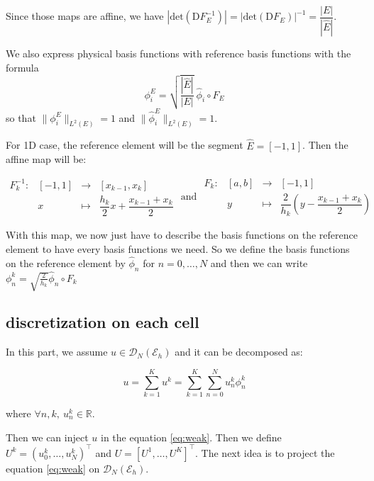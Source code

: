 \documentclass[a4paper,10pt,draft]{article}
\begin{document}
Since those maps are affine, we have $|\mathrm{det}(\mathrm{D}F_E^{-1})| = 
|\mathrm{det}(\mathrm{D}F_E)|^{-1} = \dfrac{|E|}{|\hat E|}$.

We also express physical basis functions with reference basis functions with the formula 
\begin{equation*}
 \phi_i^E = \sqrt{\dfrac{|\hat E|}{|E|}}\ \hat \phi_i \circ F_E
\end{equation*}
so that $\|\phi_i^E\|_{L^2(E)}=1$ and $\|\hat \phi_i^E\|_{L^2(E)}=1$.

For 1D case, the reference element will be the segment $\hat E = [-1,1]$. Then 
the affine map will be:

\begin{equation*}
\begin{array}{cccc}
 F_k^{-1} : & [-1,1] & \longrightarrow & [x_{k-1},x_k] \\
            & x & \longmapsto & \dfrac{h_k}{2} x + \dfrac{x_{k-1}+x_k}{2}
\end{array}
\text{ and }
\begin{array}{cccc}
 F_k : & [a,b] & \longrightarrow & [-1,1] \\
            & y & \longmapsto & \dfrac{2}{h_k} \left(y - \dfrac{x_{k-1}+x_k}{2}\right)
\end{array}
\end{equation*}

 With this map, we now just have to describe the basis functions on the reference element to have 
every basis functions we need. So we define the basis functions on the reference element by $\hat 
\phi_n$ for $n= 0, \dots , N$ and then we can write $\phi_n^k = \sqrt{\frac{2}{h_k}} \hat 
\phi_n \circ F_k$

\subsection{discretization on each cell}

In this part, we assume $u \in \mathcal{D}_N(\mathcal{E}_h)$ and it can be decomposed as:

$$
u = \sum_{k=1}^K u^k = \sum_{k=1}^K \sum_{n=0}^N u_n^k \phi_n^k
$$

where $\forall n,k,\ u_n^k \in \mathbb{R}$.


Then we can inject $u$ in the equation \ref{eq:weak}. Then we define $U^k = 
(u_0^k, \dots , u_N^k)^\top$ and $U = [U^1, \dots , U^K]^\top$. The next idea is to project the 
equation \ref{eq:weak} on $\mathcal{D}_N(\mathcal{E}_h)$.
\end{document}
